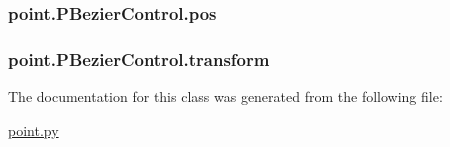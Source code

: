 \subsubsection[{pos}]{\setlength{\rightskip}{0pt plus 5cm}point.\+P\+Bezier\+Control.\+pos}\label{classpoint_1_1_p_bezier_control_aea32847f414296d7838d90bc621fdcc1}
\hypertarget{classpoint_1_1_p_bezier_control_ab8fbb1bca54765469d9c3a4b94ce6331}{}
\subsubsection[{transform}]{\setlength{\rightskip}{0pt plus 5cm}point.\+P\+Bezier\+Control.\+transform}\label{classpoint_1_1_p_bezier_control_ab8fbb1bca54765469d9c3a4b94ce6331}


The documentation for this class was generated from the following file\+:\begin{DoxyCompactItemize}
\item 
\hyperlink{point_8py}{point.\+py}\end{DoxyCompactItemize}
